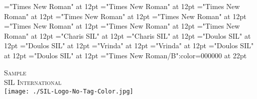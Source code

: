 \documentclass[c5paper,twoside]{article}
\begin{document}
\font\spanes="Times New Roman" at 12pt
\font\dives="Times New Roman" at 12pt
\font\spanen="Times New Roman" at 12pt
\font\diven="Times New Roman" at 12pt
\font\spanenfonipa="Times New Roman" at 12pt
\font\divenfonipa="Times New Roman" at 12pt
\font\spande="Times New Roman" at 12pt
\font\divde="Times New Roman" at 12pt
\font\spanbzh="Charis SIL" at 12pt
\font\divbzh="Charis SIL" at 12pt
\font\spanbzhfonipa="Doulos SIL" at 12pt
\font\divbzhfonipa="Doulos SIL" at 12pt
\font\spanbn="Vrinda" at 12pt
\font\divbn="Vrinda" at 12pt
\font\spanbdu="Doulos SIL" at 12pt
\font\divbdu="Doulos SIL" at 12pt
\color{black} 
\thispagestyle{empty} 
\font\CoverPageHeading="Times New Roman/B":color=000000 at 22pt 
\vskip 60pt 
\begin{center} 
\end{center} 
\newpage 
\newpage 
\thispagestyle{empty} 
\mbox{} 
\begin{titlepage}
\begin{center}
\textsc{\LARGE Sample}\\[1.5cm] 
\vspace{140 mm} 
\textsc{SIL International}\\[0.5cm] 
\texttt{[image: ./SIL-Logo-No-Tag-Color.jpg]}\\[1cm]    
\end{center} 
\end{titlepage} 
\newpage 
\newpage 
\mbox{} 
\setcounter{page}{1} 
 
\pagestyle{plain} 
\newpage 
\newpage 
\thispagestyle{empty} 
\mbox{} 

\newpage 
\pagestyle{plain} 
\tableofcontents 
\newpage 
\setcounter{page}{1} 
\end{document}
